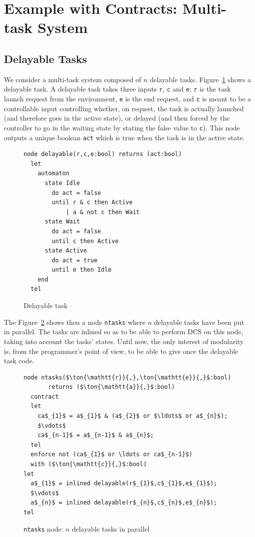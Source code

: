 \documentclass[a4paper]{article}
\begin{document}
\section{Example with Contracts:  Multi-task System}
\label{sec:multi-task-system}

\subsection{Delayable Tasks}
\label{sec:delayable-tasks}



We consider a multi-task system composed of $n$ delayable
tasks. Figure~\ref{fig:del-task} shows a delayable task. A delayable task takes
three inputs \texttt{r}, \texttt{c} and \texttt{e}: \texttt{r} is the task
launch request from the environment, \texttt{e} is the end request, and
\texttt{c} is meant to be a controllable input controlling whether, on request,
the task is actually launched (and therefore goes in the active state), or
delayed (and then forced by the controller to go in the waiting state by stating
the false value to \texttt{c}). This node outputs a unique boolean \texttt{act}
which is true when the task is in the active state.

\begin{figure}[htb]
\begin{lstlisting}
node delayable(r,c,e:bool) returns (act:bool)
  let
    automaton
      state Idle
        do act = false
        until r & c then Active
            | a & not c then Wait
      state Wait
        do act = false
        until c then Active
      state Active
        do act = true
        until e then Idle
    end
  tel
\end{lstlisting}
\caption{Delayable task}
\label{fig:del-task}
\end{figure}

The Figure~\ref{fig:n-del-task} shows then a node \texttt{ntasks} where $n$
delayable tasks have been put in parallel. The tasks are inlined so as to be
able to perform DCS on this node, taking into account the tasks' states. Until
now, the only interest of modularity is, from the programmer's point of view, to
be able to give once the delayable task code.

\begin{figure}[htb]
\begin{lstlisting}
node ntasks($\ton{\mathtt{r}}{,},\ton{\mathtt{e}}{,}$:bool)
       returns ($\ton{\mathtt{a}}{,}$:bool)
  contract
  let
    ca$_{1}$ = a$_{1}$ & (a$_{2}$ or $\ldots$ or a$_{n}$);
    $\vdots$
    ca$_{n-1}$ = a$_{n-1}$ & a$_{n}$;
  tel
  enforce not (ca$_{1}$ or \ldots or ca$_{n-1}$) 
  with ($\ton{\mathtt{c}}{,}$:bool)
let
  a$_{1}$ = inlined delayable(r$_{1}$,c$_{1}$,e$_{1}$); 
  $\vdots$
  a$_{n}$ = inlined delayable(r$_{n}$,c$_{n}$,e$_{n}$); 
tel
\end{lstlisting}
\caption{\texttt{ntasks} node: $n$ delayable tasks in parallel}
\label{fig:n-del-task}
\end{figure}
\end{document}
